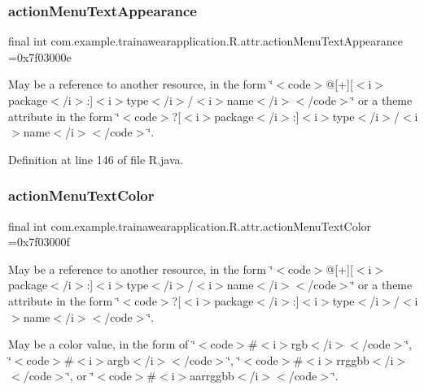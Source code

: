 \subsubsection{\texorpdfstring{actionMenuTextAppearance}{actionMenuTextAppearance}}
{\footnotesize\ttfamily final int com.\+example.\+trainawearapplication.\+R.\+attr.\+action\+Menu\+Text\+Appearance =0x7f03000e\hspace{0.3cm}{\ttfamily [static]}}

May be a reference to another resource, in the form \char`\"{}$<$code$>$@\mbox{[}+\mbox{]}\mbox{[}$<$i$>$package$<$/i$>$\+:\mbox{]}$<$i$>$type$<$/i$>$/$<$i$>$name$<$/i$>$$<$/code$>$\char`\"{} or a theme attribute in the form \char`\"{}$<$code$>$?\mbox{[}$<$i$>$package$<$/i$>$\+:\mbox{]}$<$i$>$type$<$/i$>$/$<$i$>$name$<$/i$>$$<$/code$>$\char`\"{}. 

Definition at line 146 of file R.\+java.

\mbox{\label{classcom_1_1example_1_1trainawearapplication_1_1_r_1_1attr_ac8e9b4268358c8fd68e6f30deb1a70f6}} 
\subsubsection{\texorpdfstring{actionMenuTextColor}{actionMenuTextColor}}
{\footnotesize\ttfamily final int com.\+example.\+trainawearapplication.\+R.\+attr.\+action\+Menu\+Text\+Color =0x7f03000f\hspace{0.3cm}{\ttfamily [static]}}

May be a reference to another resource, in the form \char`\"{}$<$code$>$@\mbox{[}+\mbox{]}\mbox{[}$<$i$>$package$<$/i$>$\+:\mbox{]}$<$i$>$type$<$/i$>$/$<$i$>$name$<$/i$>$$<$/code$>$\char`\"{} or a theme attribute in the form \char`\"{}$<$code$>$?\mbox{[}$<$i$>$package$<$/i$>$\+:\mbox{]}$<$i$>$type$<$/i$>$/$<$i$>$name$<$/i$>$$<$/code$>$\char`\"{}. 

May be a color value, in the form of \char`\"{}$<$code$>$\#$<$i$>$rgb$<$/i$>$$<$/code$>$\char`\"{}, \char`\"{}$<$code$>$\#$<$i$>$argb$<$/i$>$$<$/code$>$\char`\"{}, \char`\"{}$<$code$>$\#$<$i$>$rrggbb$<$/i$>$$<$/code$>$\char`\"{}, or \char`\"{}$<$code$>$\#$<$i$>$aarrggbb$<$/i$>$$<$/code$>$\char`\"{}. 


